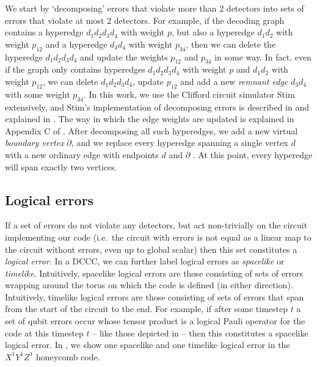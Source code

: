 We start by `decomposing' errors that violate more than $2$ detectors into sets of errors that violate at most $2$ detectors.
For example, if the decoding graph contains a hyperedge $d_1 d_2 d_3 d_4$ with weight $p$,
but also a hyperedge $d_1 d_2$ with weight $p_{12}$ and a hyperedge $d_3 d_4$ with weight $p_{34}$,
then we can delete the hyperedge $d_1 d_2 d_3 d_4$ and update the weights $p_{12}$ and $p_{34}$ in some way.
In fact, even if the graph only contains hyperedges $d_1 d_2 d_3 d_4$ with weight $p$ and $d_1 d_2$ with weight $p_{12}$, 
we can delete $d_1 d_2 d_3 d_4$, update $p_{12}$ and add a new \emph{remnant edge} $d_3 d_4$ with some weight $p_{34}$.
In this work, we use the Clifford circuit simulator Stim~\cite{Gidney2021stimfaststabilizer} extensively,
and Stim's implementation of decomposing errors is described in  and explained in .
The way in which the edge weights are updated is explained in Appendix C of .
After decomposing all such hyperedges, we add a new virtual \emph{boundary vertex} $\partial$, and we replace every hyperedge spanning a single vertex $d$ with a new ordinary edge with endpoints $d$ and $\partial$ \cite{higgott2025sparse}.
At this point, every hyperedge will span exactly two vertices.

\subsection{Logical errors}\label{subsec:DCCCs_logical_errors}

If a set of errors do not violate any detectors,
but act non-trivially on the circuit implementing our code
(i.e.\ the circuit with errors is not equal as a linear map to the circuit without errors, even up to global scalar)
then this set constitutes a \textit{logical error}.
In a DCCC, we can further label logical errors as \textit{spacelike} or \textit{timelike}.
Intuitively, spacelike logical errors are those consisting of sets of errors wrapping around the torus on which the code is defined (in either direction).
Intuitively, timelike logical errors are those consisting of sets of errors that span from the start of the circuit to the end.
For example, if after some timestep $t$ a set of qubit errors occur whose tensor product is a logical Pauli operator for the code at this timestep $t$ -- like those depicted in  -- then this constitutes a spacelike logical error.
In , we show one spacelike and one timelike logical error in the $X^1Y^1Z^1$ honeycomb code.

